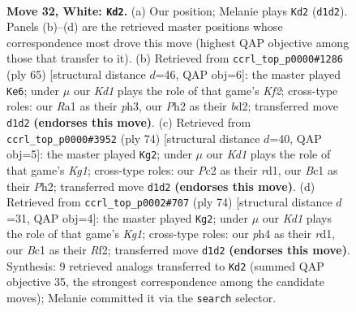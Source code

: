 \documentclass[11pt]{article}
\begin{document}
\clearpage

\begin{figure}[p]\centering
\begin{subfigure}{0.46\textwidth}\centering
\resizebox{\linewidth}{!}{%
\newchessgame
\chessboard[
  setfen={7r/3n1k2/8/8/p1p1p2p/P1P5/2P2PPP/R1BK4 w - - 1 32},
  showmover=false,
  pgfstyle=straightmove, color=movearrow, markmove={d1-d2}
]}
\caption{}
\end{subfigure}\hfill
\begin{subfigure}{0.46\textwidth}\centering
\resizebox{\linewidth}{!}{%
\newchessgame
\chessboard[
  setfen={8/4bk2/p1p2pp1/4p3/2P3P1/5P1P/P2B4/5K2 b - - 0 33},
  showmover=false,
  pgfstyle=straightmove, color=movearrow, markmove={f7-e6}
]}
\caption{}
\end{subfigure}
\\[4pt]
\begin{subfigure}{0.46\textwidth}\centering
\resizebox{\linewidth}{!}{%
\newchessgame
\chessboard[
  setfen={5k2/8/6p1/p1p1Pp1p/2B2P1b/PPP2R2/7P/3r2K1 w - - 5 38},
  showmover=false,
  pgfstyle=straightmove, color=movearrow, markmove={g1-g2}
]}
\caption{}
\end{subfigure}\hfill
\begin{subfigure}{0.46\textwidth}\centering
\resizebox{\linewidth}{!}{%
\newchessgame
\chessboard[
  setfen={4n3/8/p1p4k/5ppp/8/1PB2PPP/1P3R2/3r2K1 w - - 4 38},
  showmover=false,
  pgfstyle=straightmove, color=movearrow, markmove={g1-g2}
]}
\caption{}
\end{subfigure}
\caption{\textbf{Move 32, White: \texttt{Kd2}.} (a) Our position; Melanie plays \texttt{Kd2} (\texttt{d1d2}). Panels (b)--(d) are the retrieved master positions whose correspondence most drove this move (highest QAP objective among those that transfer to it). (b) Retrieved from \texttt{ccrl\_top\_p0000\#1286} (ply 65) [structural distance $d$=46, QAP obj=6]: the master played \texttt{Ke6}; under $\mu$ our \emph{Kd1} plays the role of that game's \emph{Kf2}; cross-type roles: our \emph{R}a1 as their \emph{p}h3, our \emph{P}h2 as their \emph{b}d2; transferred move \texttt{d1d2} \textbf{(endorses this move)}. (c) Retrieved from \texttt{ccrl\_top\_p0000\#3952} (ply 74) [structural distance $d$=40, QAP obj=5]: the master played \texttt{Kg2}; under $\mu$ our \emph{Kd1} plays the role of that game's \emph{Kg1}; cross-type roles: our \emph{P}c2 as their \emph{r}d1, our \emph{B}c1 as their \emph{P}h2; transferred move \texttt{d1d2} \textbf{(endorses this move)}. (d) Retrieved from \texttt{ccrl\_top\_p0002\#707} (ply 74) [structural distance $d$=31, QAP obj=4]: the master played \texttt{Kg2}; under $\mu$ our \emph{Kd1} plays the role of that game's \emph{Kg1}; cross-type roles: our \emph{p}h4 as their \emph{r}d1, our \emph{B}c1 as their \emph{R}f2; transferred move \texttt{d1d2} \textbf{(endorses this move)}. Synthesis: 9 retrieved analogs transferred to \texttt{Kd2} (summed QAP objective 35, the strongest correspondence among the candidate moves); Melanie committed it via the \texttt{search} selector.}
\label{fig:thought-m62}
\end{figure}
\end{document}
